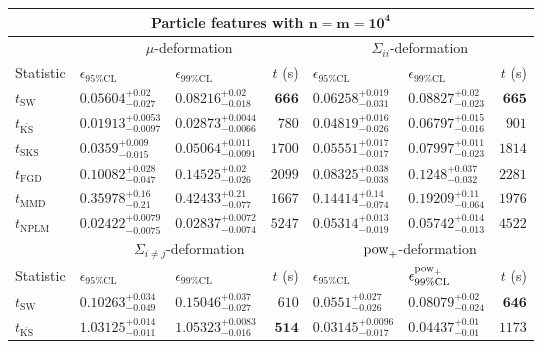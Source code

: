 \begin{tabular}{l|llr|llr}
	\toprule
	\multicolumn{7}{c}{{\bf Particle features with $\mathbf{n=m=10^{4}}$}} \\
	\toprule
	\multicolumn{1}{c}{} & \multicolumn{3}{c}{$\mu$-deformation} & \multicolumn{3}{c}{$\Sigma_{ii}$-deformation} \\
	Statistic & $\epsilon_{95\%\mathrm{CL}}$ & $\epsilon_{99\%\mathrm    {CL}}$ & $t$ (s) & $\epsilon_{95\%\mathrm{CL}}$ & $\epsilon_{99\%\mathrm{CL}}$ & $t$ (s) \\
	\midrule
	$t_{\mathrm{SW}}$ & $0.05604_{-0.027}^{+0.02}$ & $0.08216_{-0.018}^{+0.02}$ & ${\mathbf{666}}$ & $0.06258_{-0.031}^{+0.019}$ & $0.08827_{-0.023}^{+0.02}$ & ${\mathbf{665}}$ \\
	$t_{\overline{\mathrm{KS}}}$ & ${\mathbf{0.01913_{-0.0097}^{+0.0053}}}$ & ${\mathbf{0.02873_{-0.0066}^{+0.0044}}}$ & $780$ & ${\mathbf{0.04819_{-0.026}^{+0.016}}}$ & ${\mathbf{0.06797_{-0.016}^{+0.015}}}$ & $901$ \\
	$t_{\mathrm{SKS}}$ & $0.0359_{-0.015}^{+0.009}$ & $0.05064_{-0.0091}^{+0.011}$ & $1700$ & $0.05551_{-0.017}^{+0.017}$ & $0.07997_{-0.023}^{+0.011}$ & $1814$ \\
	$t_{\mathrm{FGD}}$ & $0.10082_{-0.047}^{+0.028}$ & $0.14525_{-0.026}^{+0.02}$ & $2099$ & $0.08325_{-0.038}^{+0.038}$ & $0.1248_{-0.032}^{+0.037}$ & $2281$ \\
	$t_{\mathrm{MMD}}$ & $0.35978_{-0.21}^{+0.16}$ & $0.42433_{-0.077}^{+0.21}$ & $1667$ & $0.14414_{-0.074}^{+0.14}$ & $0.19209_{-0.064}^{+0.11}$ & $1976$ \\
\rowcolor{red!35}	$t_{\mathrm{NPLM}}$ & $0.02422_{-0.0075}^{+0.0079}$ & $0.02837_{-0.0074}^{+0.0072}$ & $5247$ & $0.05314_{-0.019}^{+0.013}$ & $0.05742_{-0.013}^{+0.014}$ & $4522$ \\
	\toprule
	\multicolumn{1}{c}{} & \multicolumn{3}{c}{$\Sigma_{i\neq j}$-deformation} & \multicolumn{3}{c}{$\rm{pow}_{+}$-deformation} \\
	Statistic & $\epsilon_{95\%\mathrm{CL}}$ & $\epsilon_{99\%\mathrm{CL}}$ & $t$ (s) & $\epsilon_{95\%\mathrm{CL}}$ & $\epsilon^{\rm   {pow}_{+}}_{99\%\mathrm{CL}}$ & $t$ (s) \\
	\midrule
	$t_{\mathrm{SW}}$ & $0.10263_{-0.049}^{+0.034}$ & $0.15046_{-0.027}^{+0.037}$ & $610$ & $0.0551_{-0.026}^{+0.027}$ & $0.08079_{-0.024}^{+0.02}$ & ${\mathbf{646}}$ \\
	$t_{\overline{\mathrm{KS}}}$ & $1.03125_{-0.011}^{+0.014}$ & $1.05323_{-0.016}^{+0.0083}$ & ${\mathbf{514}}$ & ${\mathbf{0.03145_{-0.017}^{+0.0096}}}$ & ${\mathbf{0.04437_{-0.01}^{+0.01}}}$ & $1173$ \\

\end{tabular}
